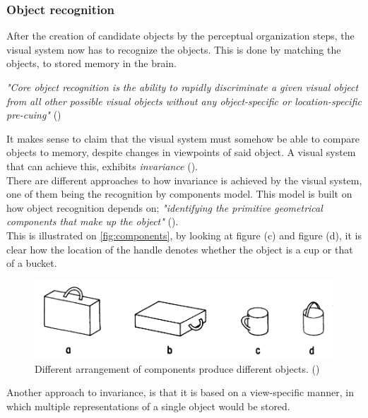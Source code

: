 \documentclass{article}
\newcommand{\goodcite}[1]{ {(\cite{#1})}}
\begin{document}
\subsubsection{Object recognition}
After the creation of candidate objects by the perceptual organization steps, the visual system now has to recognize the objects. This is done by matching the objects, to stored memory in the brain.\\

\begin{center}
\textit{"Core object recognition is the ability to rapidly discriminate a given visual object from all other possible visual objects without any object-specific or location-specific pre-cuing"}\goodcite{solveVisual}\\
\end{center}

It makes sense to claim that the visual system must somehow be able to compare objects to memory, despite changes in viewpoints of said object. A visual system that can achieve this, exhibits \textit{invariance}\goodcite{hsp}.\\There are different approaches to how invariance is achieved by the visual system, one of them being the recognition by components model. This model is built on how object recognition depends on; \textit{"identifying the primitive geometrical components that make up the object"}\goodcite{hsp}.\\This is illustrated on \autoref{fig:components}, by looking at figure (c) and figure (d), it is clear how the location of the handle denotes whether the object is a cup or that of a bucket.

\begin{figure}[H]
    \centering
    \includegraphics[width=\textwidth]{img/comps.png}
    \caption{Different arrangement of components produce different objects.\goodcite{bieder}}
    \label{fig:components}
\end{figure}


Another approach to invariance, is that it is based on a view-specific manner, in which multiple representations of a single object would be stored.\medskip \\ %
\end{document}
